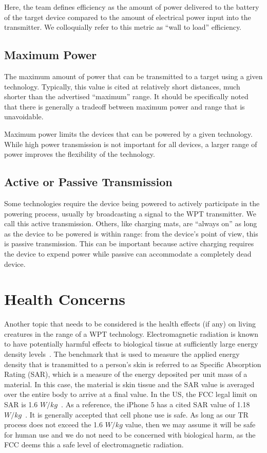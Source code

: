 Here, the team defines efficiency as the amount of power delivered to the battery of the target device compared to the amount of electrical power input into the transmitter. We colloquially refer to this metric as ``wall to load'' efficiency.

\subsection{Maximum Power}

The maximum amount of power that can be transmitted to a target using a given technology. Typically, this value is cited at relatively short distances, much shorter than the advertised ``maximum'' range. It should be specifically noted that there is generally a tradeoff between maximum power and range that is unavoidable.

Maximum power limits the devices that can be powered by a given technology. While high power transmission is not important for all devices, a larger range of power improves the flexibility of the technology.

\subsection{Active or Passive Transmission}

Some technologies require the device being powered to actively participate in the powering process, usually by broadcasting a signal to the WPT transmitter. We call this active transmission. Others, like charging mats, are ``always on'' as long as the device to be powered is within range: from the device's point of view, this is passive transmission. This can be important because active charging requires the device to expend power while passive can accommodate a completely dead device.

\section{Health Concerns}

Another topic that needs to be considered is the health effects (if any) on living creatures in the range of a WPT technology. Electromagnetic radiation is known to have potentially harmful effects to biological tissue at sufficiently large energy density levels~\cite{adey1993biological}. The benchmark that is used to measure the applied energy density that is transmitted to a person's skin is referred to as Specific Absorption Rating (SAR), which is a measure of the energy deposited per unit mass of a material. In this case, the material is skin tissue and the SAR value is averaged over the entire body to arrive at a final value. In the US, the FCC legal limit on SAR is 1.6 $W/kg$~\cite{procon2015}. As a reference, the iPhone 5 has a cited SAR value of 1.18 $W/kg$~\cite{procon2015}. It is generally accepted that cell phone use is safe. As long as our TR process does not exceed the 1.6 $W/kg$ value, then we may assume it will be safe for human use and we do not need to be concerned with biological harm, as the FCC deems this a safe level of electromagnetic radiation.

